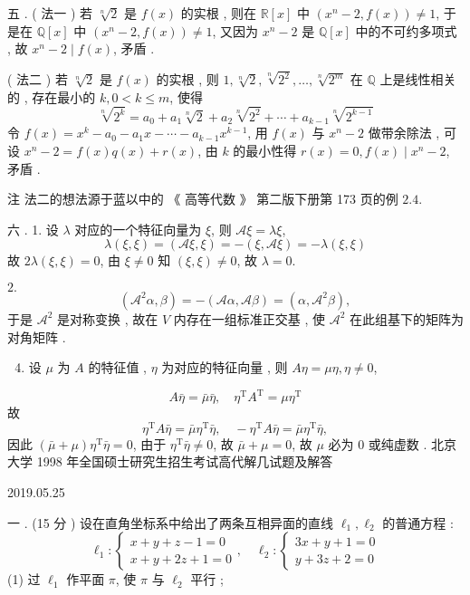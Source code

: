\documentclass[10pt]{article}
\begin{document}
 五 . ( 法一 )  若  $\sqrt[n]{2}$  是  $f(x)$  的实根 ,  则在  $\mathbb{R}[x]$  中  $\left(x^{n}-2, f(x)\right) \neq 1$,  于是在  $\mathbb{Q}[x]$  中  $\left(x^{n}-2, f(x)\right) \neq 1$,  又因为  $x^{n}-2$  是  $\mathbb{Q}[x]$  中的不可约多项式 ,  故  $x^{n}-2 \mid f(x)$,  矛盾 .

( 法二 )  若  $\sqrt[n]{2}$  是  $f(x)$  的实根 ,  则  $1, \sqrt[n]{2}, \sqrt[n]{2^{2}}, \ldots, \sqrt[n]{2^{m}}$  在  $\mathbb{Q}$  上是线性相关的 ,  存在最小的  $k, 0<k \leqslant m$,  使得 
$$
\sqrt[n]{2^{k}}=a_{0}+a_{1} \sqrt[n]{2}+a_{2} \sqrt[n]{2^{2}}+\cdots+a_{k-1} \sqrt[n]{2^{k-1}}
$$
 令  $f(x)=x^{k}-a_{0}-a_{1} x-\cdots-a_{k-1} x^{k-1}$,  用  $f(x)$  与  $x^{n}-2$  做带余除法 ,  可设  $x^{n}-2=f(x) q(x)+r(x)$,  由  $k$  的最小性得  $r(x)=0, f(x) \mid x^{n}-2$,  矛盾 .

 注   法二的想法源于蓝以中的 《 高等代数 》 第二版下册第  173  页的例  $2.4$.

 六 . 1.  设  $\lambda$  对应的一个特征向量为  $\xi$,  则  $\mathscr{A} \xi=\lambda \xi$,
$$
\lambda(\xi, \xi)=(\mathscr{A} \xi, \xi)=-(\xi, \mathscr{A} \xi)=-\lambda(\xi, \xi)
$$
 故  $2 \lambda(\xi, \xi)=0$,  由  $\xi \neq 0$  知  $(\xi, \xi) \neq 0$,  故  $\lambda=0$.

$2 .$
$$
\left(\mathscr{A}^{2} \alpha, \beta\right)=-(\mathscr{A} \alpha, \mathscr{A} \beta)=\left(\alpha, \mathscr{A}^{2} \beta\right),
$$
 于是  $\mathscr{A}^{2}$  是对称变换 ,  故在  $V$  内存在一组标准正交基 ,  使  $\mathscr{A}^{2}$  在此组基下的矩阵为对角矩阵 .

\begin{enumerate}
  \setcounter{enumi}{3}
  \item  设  $\mu$  为  $A$  的特征值 , $\eta$  为对应的特征向量 ,  则  $A \eta=\mu \eta, \eta \neq 0$,
\end{enumerate}
$$
A \bar{\eta}=\bar{\mu} \bar{\eta}, \quad \eta^{\mathrm{T}} A^{\mathrm{T}}=\mu \eta^{\mathrm{T}}
$$
 故 
$$
\eta^{\mathrm{T}} A \bar{\eta}=\bar{\mu} \eta^{\mathrm{T}} \bar{\eta}, \quad-\eta^{\mathrm{T}} A \bar{\eta}=\bar{\mu} \eta^{\mathrm{T}} \bar{\eta},
$$
 因此  $(\bar{\mu}+\mu) \eta^{\mathrm{T}} \bar{\eta}=0$,  由于  $\eta^{\mathrm{T}} \bar{\eta} \neq 0$,  故  $\bar{\mu}+\mu=0$,  故  $\mu$  必为  0  或纯虚数 .  北京大学  1998  年全国硕士研究生招生考试高代解几试题及解答 

   

2019.05.25

 一 . (15  分 )  设在直角坐标系中给出了两条互相异面的直线  $\ell_{1}, \ell_{2}$  的普通方程 :
$$
\ell_{1}:\left\{\begin{array}{r}
x+y+z-1=0 \\
x+y+2 z+1=0
\end{array}, \quad \ell_{2}:\left\{\begin{array}{l}
3 x+y+1=0 \\
y+3 z+2=0
\end{array}\right.\right.
$$
(1)  过  $\ell_{1}$  作平面  $\pi$,  使  $\pi$  与  $\ell_{2}$  平行 ;
\end{document}

